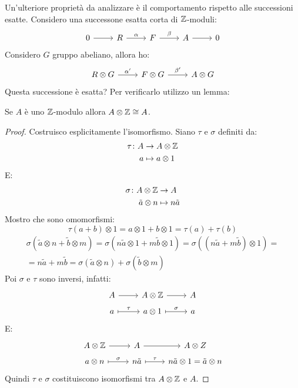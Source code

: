 Un'ulteriore proprietà da analizzare è il comportamento rispetto alle successioni
esatte. Considero una successone esatta corta di $ \mathbb{Z} $-moduli:
\[
  \begin{tikzcd}
    0 \rar{} & R \rar{\alpha} & F \rar{\beta} & A \rar & 0
  \end{tikzcd}
\]
Considero $ G $ gruppo abeliano, allora ho:
\[
  \begin{tikzcd}
    R \otimes G \rar{\alpha'} & F \otimes G \rar{\beta'} & A \otimes G
  \end{tikzcd}
\]
Questa successione è esatta? Per verificarlo utilizzo un lemma:
\begin{lemma}
  Se $ A $ è uno $ \mathbb{Z} $-modulo allora $ A \otimes \mathbb{Z} \cong A $.
\end{lemma}
\begin{proof}
  Costruisco esplicitamente l'isomorfismo. Siano $ \tau $ e $ \sigma $ definiti da:
  \begin{align*}
    \tau \colon A & \to A \otimes \mathbb{Z} \\
    a & \mapsto a \otimes 1
  \end{align*}
  E:
  \begin{align*}
    \sigma \colon A \otimes \mathbb{Z} & \to A \\
    \tilde{a} \otimes n & \mapsto n \tilde{a}
  \end{align*}
  Mostro che sono omomorfismi:
  \[
    \tau(a + b) \otimes 1 = a \otimes 1 + b \otimes 1 = \tau(a) + \tau(b)
  \]
  \begin{gather*}
    \sigma(\tilde{a} \otimes n + \tilde{b} \otimes m ) = \sigma(n \tilde{a} \otimes 1 + m \tilde{b} \otimes
    1) = \sigma ((n \tilde{a} + m\tilde{b}) \otimes 1) = \\ = n \tilde{a} + m \tilde{b} =
    \sigma(\tilde{a} \otimes n) + \sigma(\tilde{b} \otimes m)
  \end{gather*}
  Poi $ \sigma $ e $ \tau $ sono inversi, infatti:
  \[
    \begin{tikzcd}[nodes={row sep = 5 pt}]
      A \rar{} & A \otimes \Z \rar & A \\
      a \arrow[mapsto]{r}{\tau} & a \otimes 1 \arrow[mapsto]{r}{\sigma} & a
    \end{tikzcd}
  \]
  E:
  \[
    \begin{tikzcd}[nodes={row sep = 5 pt}]
      A \otimes \Z \rar & A \rar & A \otimes Z \\
      a \otimes n \arrow[mapsto]{r}{\sigma} & n \tilde{a} \arrow[mapsto]{r}{\tau} & n \tilde{a} \otimes 1 = \tilde{a} \otimes n
    \end{tikzcd}
  \]
  Quindi $ \tau $ e $ \sigma $ costituiscono isomorfismi tra $ A \otimes \mathbb{Z} $ e $ A $.
\end{proof}
